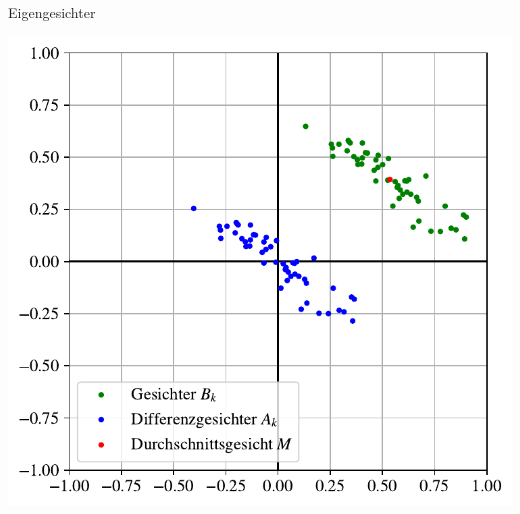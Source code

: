 \documentclass[10pt,aspectratio=169]{beamer}
\begin{document}
\begin{frame}[fragile]{Eigengesichter}
	\begin{minipage}{0.45\textwidth}
		\includegraphics[width=\textwidth]{images/facespace/meandiff}
	\end{minipage}
\end{frame}
\end{document}
